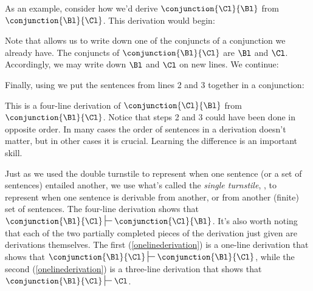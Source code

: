 As an example, consider how we'd derive $\conjunction{\Cl}{\Bl}$ from $\conjunction{\Bl}{\Cl}$. This derivation would begin:
\begin{gproof}[\label{onelinederivation}]
\end{gproof}
\noindent{}Note that  allows us to write down one of the conjuncts of a conjunction we already have. 
The conjuncts of $\conjunction{\Bl}{\Cl}$ are $\Bl$ and $\Cl$. 
Accordingly, we may write down $\Bl$ and $\Cl$ on new lines. 
We continue:
\begin{gproof}[\label{threelinederivation}]
\end{gproof}
\noindent{}Finally, using  we put the sentences from lines 2 and 3 together in a conjunction:
\begin{gproof}[\label{simpleconjunction}]
\end{gproof}
\noindent{}This is a four-line derivation of $\conjunction{\Cl}{\Bl}$ from $\conjunction{\Bl}{\Cl}$. Notice that steps 2 and 3 could have been done in opposite order. In many cases the order of sentences in a derivation doesn’t matter, but in other cases it is crucial. Learning the difference is an important skill.

Just as we used the double turnstile to represent when one sentence (or a set of sentences) entailed another, we use what's called the \emph{single turnstile}, \mention{\:$\sststile{}{}\:$}, to represent when one sentence is derivable from another, or from another (finite) set of sentences. 
The four-line derivation shows that $\conjunction{\Bl}{\Cl}\sststile{}{}\conjunction{\Cl}{\Bl}$. 
It's also worth noting that each of the two partially completed pieces of the derivation just given are derivations themselves. 
The first (\ref{onelinederivation}) is a one-line derivation that shows that $\conjunction{\Bl}{\Cl}\sststile{}{}\conjunction{\Bl}{\Cl}$, while the second (\ref{onelinederivation}) is a three-line derivation that shows that $\conjunction{\Bl}{\Cl}\sststile{}{}\Cl$.

